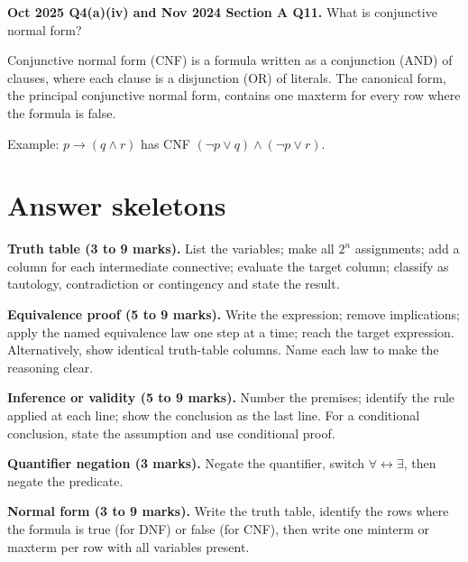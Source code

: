\documentclass[11pt,a4paper]{article}
\begin{document}
\begin{pyqbox}
\textbf{Oct 2025 Q4(a)(iv) and Nov 2024 Section A Q11.} What is conjunctive normal form?
\end{pyqbox}

\begin{solbox}
Conjunctive normal form (CNF) is a formula written as a conjunction (AND) of clauses, where each clause is a disjunction (OR) of literals. The canonical form, the principal conjunctive normal form, contains one maxterm for every row where the formula is false.

Example: $p\to(q\land r)$ has CNF $(\neg p\lor q)\land(\neg p\lor r)$.
\end{solbox}

\section{Answer skeletons}

\begin{answerbox}
\textbf{Truth table (3 to 9 marks).} List the variables; make all $2^n$ assignments; add a column for each intermediate connective; evaluate the target column; classify as tautology, contradiction or contingency and state the result.
\end{answerbox}

\begin{answerbox}
\textbf{Equivalence proof (5 to 9 marks).} Write the expression; remove implications; apply the named equivalence law one step at a time; reach the target expression. Alternatively, show identical truth-table columns. Name each law to make the reasoning clear.
\end{answerbox}

\begin{answerbox}
\textbf{Inference or validity (5 to 9 marks).} Number the premises; identify the rule applied at each line; show the conclusion as the last line. For a conditional conclusion, state the assumption and use conditional proof.
\end{answerbox}

\begin{answerbox}
\textbf{Quantifier negation (3 marks).} Negate the quantifier, switch $\forall\leftrightarrow\exists$, then negate the predicate.
\end{answerbox}

\begin{answerbox}
\textbf{Normal form (3 to 9 marks).} Write the truth table, identify the rows where the formula is true (for DNF) or false (for CNF), then write one minterm or maxterm per row with all variables present.
\end{answerbox}
\end{document}
